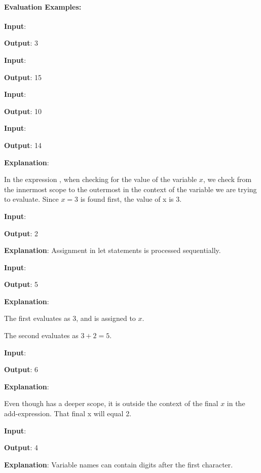 \paragraph{Evaluation Examples:}
\begin{flushleft}

\textbf{Input}: 

\textbf{Output}: 3

\textbf{Input}: 

\textbf{Output}: 15

\textbf{Input}: 

\textbf{Output}: 10

\textbf{Input}: 

\textbf{Output}: 14

\textbf{Explanation}: 

In the expression , when checking for the value of the variable $x$, we check from the innermost scope to the outermost in the context of the variable we are trying to evaluate. Since $x = 3$ is found first, the value of x is 3.

\textbf{Input}: 

\textbf{Output}: 2

\textbf{Explanation}: Assignment in let statements is processed sequentially.

\textbf{Input}: 

\textbf{Output}: 5

\textbf{Explanation}:

The first  evaluates as 3, and is assigned to $x$.

The second  evaluates as $3+2 = 5$.

\textbf{Input}: 

\textbf{Output}: 6

\textbf{Explanation}: 

Even though  has a deeper scope, it is outside the context of the final $x$ in the add-expression.  That final x will equal 2.

\textbf{Input}: 

\textbf{Output}: 4

\textbf{Explanation}: Variable names can contain digits after the first character.


\end{flushleft}
